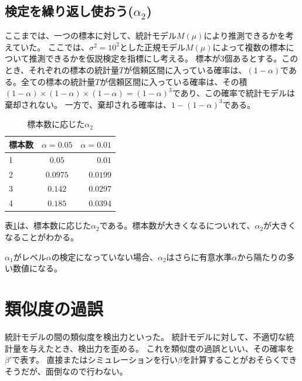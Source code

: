 \subsection{検定を繰り返し使おう($\alpha_2$)}
ここまでは、一つの標本に対して、統計モデル$M(\mu)$により推測できるかを考えていた。
ここでは、$\sigma^2=10^2$とした正規モデル$M(\mu)$によって複数の標本について推測できるかを仮説検定を指標にし考える。
標本が$3$個あるとする。このとき、それぞれの標本の統計量$T$が信頼区間に入っている確率は、$(1-\alpha)$である。全ての標本の統計量$T$が信頼区間に入っている確率は、その積$(1-\alpha)\times(1-\alpha)\times(1-\alpha)=(1-\alpha)^3$であり、この確率で統計モデルは棄却されない。
一方で、棄却される確率は、$1-(1-\alpha)^3$である。
\begin{table}[hbtp]
    \caption{標本数に応じた$\alpha_2$}
    \label{table:multiple_test_reject_prob}
    \centering
    \begin{tabular}{lcr}
      \hline
      標本数  & $\alpha=0.05$  &  $\alpha=0.01$ \\
      \hline \hline
       1 & $0.05$  & $0.01$ \\
       2 & $0.0975$ & $0.0199$\\
       3 & $0.142$ & $0.0297$\\
       4 & $0.185$ & $0.0394$\\
    \end{tabular}
  \end{table}
表\ref{table:multiple_test_reject_prob}は、標本数に応じた$\alpha_2$である。標本数が大きくなるについれて、$\alpha_2$が大きくなることがわかる。

$\alpha_1$がレベル$\alpha$の検定になっていない場合、$\alpha_2$はさらに有意水準$\alpha$から隔たりの多い数値になる。




\section{類似度の過誤}
統計モデルの間の類似度を検出力といった。
統計モデルに対して、不適切な統計量を与えたとき、検出力を歪める。
これを類似度の過誤といい、その確率を$\beta'$で表す。
直接またはシミュレーションを行い$\beta$を計算することがおそらくできそうだが、面倒なので行わない。



